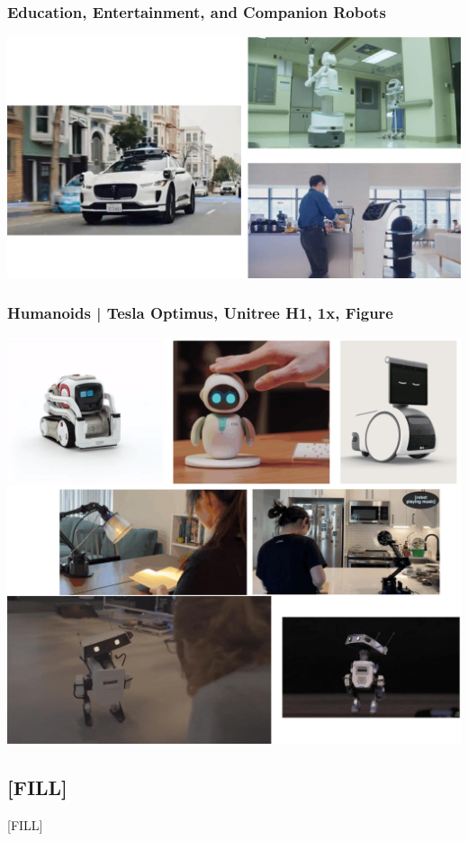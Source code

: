 \documentclass[10pt]{article}
\begin{document}
\subsubsection*{Education, Entertainment, and Companion Robots}
\begin{center} 
	\includegraphics*[width=\textwidth]{L1_7.png} 
\end{center}
\subsubsection*{Humanoids | Tesla Optimus, Unitree H1, 1x, Figure}
\begin{center} 
	\includegraphics*[width=\textwidth]{L1_8.png} 
\end{center}

\subsection*{[FILL]}
[FILL]
\end{document}
